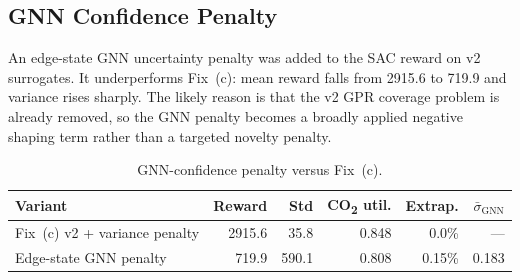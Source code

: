 \documentclass[11pt,a4paper]{article}
\begin{document}
\begin{table}[H]
  \centering
  \caption{PPO fix sweep from \texttt{outputs/ppo\_fix\_results.csv}.
           VecNormalize rows use a different reward scale from plain PPO rows.}
  \label{tab:ppo-fix}
  \small
\end{table}

\subsection{GNN Confidence Penalty}

An edge-state GNN uncertainty penalty was added to the SAC reward on v2
surrogates. It underperforms Fix~(c): mean reward falls from 2915.6 to 719.9
and variance rises sharply. The likely reason is that the v2 GPR coverage
problem is already removed, so the GNN penalty becomes a broadly applied
negative shaping term rather than a targeted novelty penalty.

\begin{table}[H]
  \centering
  \caption{GNN-confidence penalty versus Fix~(c).}
  \label{tab:gnn-penalty}
  \small
  \begin{tabular}{l rrrrr}
    \toprule
    \textbf{Variant} & \textbf{Reward} & \textbf{Std}
      & \textbf{CO\textsubscript{2} util.} & \textbf{Extrap.}
      & $\bar{\sigma}_{\mathrm{GNN}}$ \\
    \midrule
    Fix~(c) v2 + variance penalty & 2915.6 & 35.8  & 0.848 & 0.0\%  & --- \\
    Edge-state GNN penalty        & 719.9  & 590.1 & 0.808 & 0.15\% & 0.183 \\
    \bottomrule
  \end{tabular}
\end{table}
\end{document}
